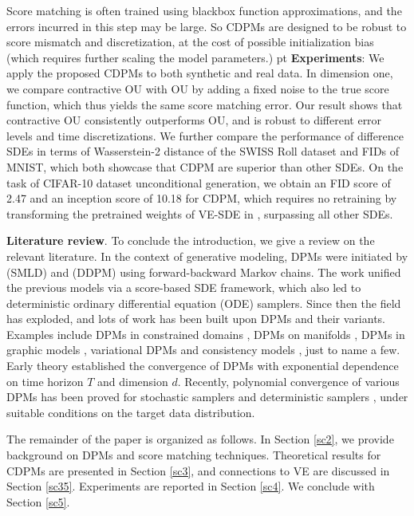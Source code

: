 \documentclass[letterpaper,11pt,reqno]{amsart}
\numberwithin{equation}{section}
\begin{document}
Score matching is often trained using blackbox function approximations,
and the errors incurred in this step may be large. 
So CDPMs are designed to be robust to score mismatch
and discretization,
at the cost of possible initialization bias
(which requires further scaling the model parameters.)
 pt
{\bf Experiments}: We apply the proposed CDPMs to both synthetic and real data. In dimension one, we compare contractive OU with OU by adding a fixed noise to the true score function, which thus yields the same score matching error. Our result shows that contractive OU consistently outperforms OU, and is robust to different error levels and time discretizations. We further compare the performance of difference SDEs in terms of Wasserstein-2 distance of the SWISS Roll dataset and FIDs of MNIST, which both showcase that CDPM are superior than other SDEs. On the task of CIFAR-10 dataset unconditional generation, we obtain an FID score of 2.47 and an inception score of 10.18 for CDPM, which requires no retraining by transforming the pretrained weights of VE-SDE in \cite{Song20}, surpassing all other SDEs.
 
\smallskip
\noindent
{\bf Literature review}.
To conclude the introduction,
we give a review on the relevant literature. 
In the context of generative modeling, 
DPMs were initiated by \cite{Song19} (SMLD) and \cite{Ho20} (DDPM)
using forward-backward Markov chains.
The work \cite{Song20, Song21} unified the previous models 
via a score-based SDE framework,
which also led to deterministic ordinary differential equation (ODE) samplers.
Since then the field has exploded, 
and lots of work has been built upon DPMs and their variants.
Examples include 
DPMs in constrained domains \cite{FK23, LE23, RDD22, DS22},
DPMs on manifolds \cite{Pid22, DeB22, CH23},
DPMs in graphic models \cite{Mei23},
variational DPMs \cite{Kingma21, VK21}
and consistency models \cite{SDC23},
just to name a few.
Early theory \cite{DV21, DeB22, KW22} established the convergence 
of DPMs with exponential dependence on time horizon $T$
and dimension $d$.
Recently, polynomial convergence of various DPMs has been proved
for stochastic samplers \cite{Chen23, Ben23a, LW23, GNZ23, LLT22, LLT23}
and deterministic samplers \cite{Ben23b, Chen23b, Chen23c, LW23},
under suitable conditions on the target data distribution. 

\medskip
\quad The remainder of the paper is organized as follows.
In Section \ref{sc2}, we provide background on DPMs and score matching techniques.
Theoretical results for CDPMs are presented in Section \ref{sc3},
and connections to VE are discussed in Section \ref{sc35}.
Experiments are reported in Section \ref{sc4}.
We conclude with Section \ref{sc5}.
\end{document}
